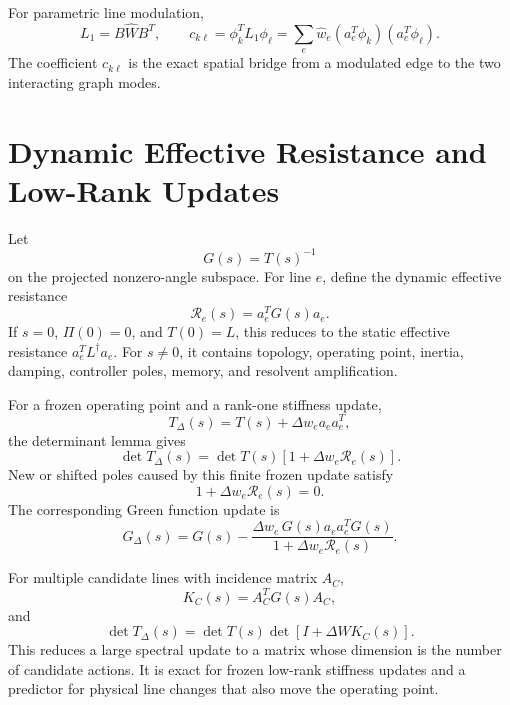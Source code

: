 For parametric line modulation,
\begin{equation}
  L_1=B\widehat W B^T,\qquad
  c_{k\ell}=\phi_k^TL_1\phi_\ell
  =
  \sum_e \widehat w_e(a_e^T\phi_k)(a_e^T\phi_\ell).
  \label{eq:graph_parametric_coupling}
\end{equation}
The coefficient \(c_{k\ell}\) is the exact spatial bridge from a modulated
edge to the two interacting graph modes.

\section{Dynamic Effective Resistance and Low-Rank Updates}

Let
\begin{equation}
  G(s)=T(s)^{-1}
  \label{eq:graph_green_function}
\end{equation}
on the projected nonzero-angle subspace. For line \(e\), define the dynamic
effective resistance
\begin{equation}
  \mathcal R_e(s)=a_e^TG(s)a_e.
  \label{eq:graph_dynamic_effective_resistance}
\end{equation}
If \(s=0\), \(\Pi(0)=0\), and \(T(0)=L\), this reduces to the static effective
resistance \(a_e^TL^\dagger a_e\). For \(s\ne0\), it contains topology,
operating point, inertia, damping, controller poles, memory, and resolvent
amplification.

For a frozen operating point and a rank-one stiffness update,
\begin{equation}
  T_\Delta(s)=T(s)+\Delta w_ea_ea_e^T,
  \label{eq:graph_rank_one_update}
\end{equation}
the determinant lemma gives
\begin{equation}
  \det T_\Delta(s)
  =
  \det T(s)\left[1+\Delta w_e\mathcal R_e(s)\right].
  \label{eq:graph_det_rank_one}
\end{equation}
New or shifted poles caused by this finite frozen update satisfy
\begin{equation}
  1+\Delta w_e\mathcal R_e(s)=0.
  \label{eq:graph_pole_update_equation}
\end{equation}
The corresponding Green function update is
\begin{equation}
  G_\Delta(s)
  =
  G(s)
  -
  \frac{\Delta w_e\,G(s)a_ea_e^TG(s)}
  {1+\Delta w_e\mathcal R_e(s)}.
  \label{eq:graph_green_update}
\end{equation}

For multiple candidate lines with incidence matrix \(A_C\),
\begin{equation}
  K_C(s)=A_C^TG(s)A_C,
  \label{eq:graph_candidate_kernel}
\end{equation}
and
\begin{equation}
  \det T_\Delta(s)
  =
  \det T(s)\det\!\left[I+\Delta W K_C(s)\right].
  \label{eq:graph_multi_det_update}
\end{equation}
This reduces a large spectral update to a matrix whose dimension is the number
of candidate actions. It is exact for frozen low-rank stiffness updates and a
predictor for physical line changes that also move the operating point.

